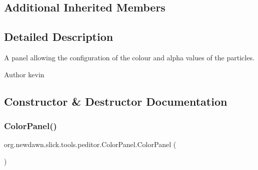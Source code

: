 \subsection*{Additional Inherited Members}


\subsection{Detailed Description}
A panel allowing the configuration of the colour and alpha values of the particles.

\begin{DoxyAuthor}{Author}
kevin 
\end{DoxyAuthor}


\subsection{Constructor \& Destructor Documentation}
\mbox{\label{classorg_1_1newdawn_1_1slick_1_1tools_1_1peditor_1_1_color_panel_a6b93e7ef840734bb2af57e4afd0a2612}} 
\subsubsection{\texorpdfstring{Color\+Panel()}{ColorPanel()}}
{\footnotesize\ttfamily org.\+newdawn.\+slick.\+tools.\+peditor.\+Color\+Panel.\+Color\+Panel (\begin{DoxyParamCaption}{ }\end{DoxyParamCaption})\hspace{0.3cm}{\ttfamily [inline]}}

